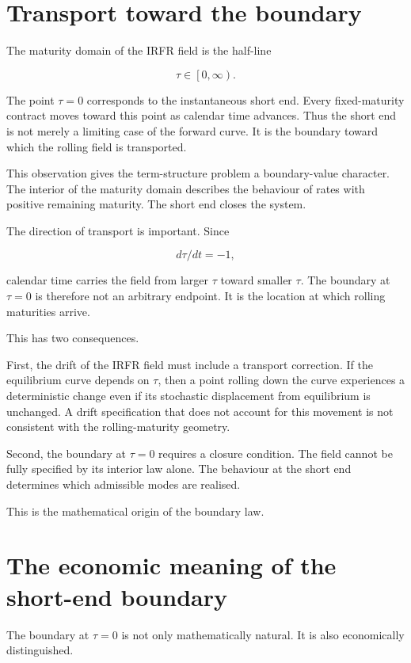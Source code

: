 \documentclass[11pt,oneside]{book}
\begin{document}
\section{Transport toward the
boundary}\label{transport-toward-the-boundary}

The maturity domain of the IRFR field is the half-line

\[
\tau \in \left[0,\infty\right).
\]

The point $\tau=0$ corresponds to the instantaneous short end. Every
fixed-maturity contract moves toward this point as calendar time
advances. Thus the short end is not merely a limiting case of the
forward curve. It is the boundary toward which the rolling field is
transported.

This observation gives the term-structure problem a boundary-value
character. The interior of the maturity domain describes the behaviour
of rates with positive remaining maturity. The short end closes the
system.

The direction of transport is important. Since

\[
d\tau/dt = -1,
\]

calendar time carries the field from larger $\tau$ toward smaller $\tau$. The
boundary at $\tau=0$ is therefore not an arbitrary endpoint. It is the
location at which rolling maturities arrive.

This has two consequences.

First, the drift of the IRFR field must include a transport correction.
If the equilibrium curve depends on $\tau$, then a point rolling down the
curve experiences a deterministic change even if its stochastic
displacement from equilibrium is unchanged. A drift specification that
does not account for this movement is not consistent with the
rolling-maturity geometry.

Second, the boundary at $\tau=0$ requires a closure condition. The field
cannot be fully specified by its interior law alone. The behaviour at
the short end determines which admissible modes are realised.

This is the mathematical origin of the boundary law.

\section{The economic meaning of the short-end
boundary}\label{the-economic-meaning-of-the-short-end-boundary}

The boundary at $\tau=0$ is not only mathematically natural. It is also
economically distinguished.
\end{document}

